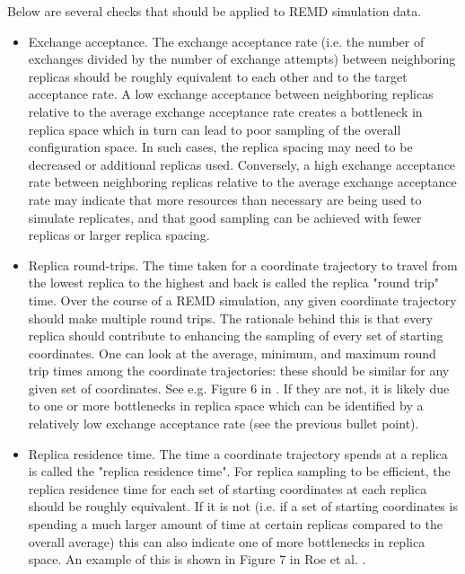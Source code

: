 Below are several checks that should be applied to REMD simulation data.

\begin{itemize}
  \item Exchange acceptance. The exchange acceptance rate (i.e. the number of exchanges divided by the number of exchange attempts) between neighboring replicas should be roughly equivalent to each other and to the target acceptance rate. A low exchange acceptance between neighboring replicas relative to the average exchange acceptance rate creates a bottleneck in replica space which in turn can lead to poor sampling of the overall configuration space.  In such cases, the replica spacing may need to be decreased or additional replicas used.  Conversely, a high exchange acceptance rate between neighboring replicas relative to the average exchange acceptance rate may indicate that more resources than necessary are being used to simulate replicates, and that good sampling can be achieved with fewer replicas or larger replica spacing.  
  \item Replica round-trips. The time taken for a coordinate trajectory to travel from the lowest replica to the highest and back is called the replica "round trip" time. Over the course of a REMD simulation, any given coordinate trajectory should make multiple round trips. The rationale behind this is that every replica should contribute to enhancing the sampling of every set of starting coordinates.  
One can look at the average, minimum, and maximum round trip times among the coordinate trajectories: these should be similar for any given set of coordinates. See e.g. Figure 6 in \citep{Roe2014}. %
If they are not, it is likely due to one or more bottlenecks in replica space which can be identified by a relatively low exchange acceptance rate (see the previous bullet point).
  \item Replica residence time. The time a coordinate trajectory spends at a replica is called the "replica residence time". For replica sampling to be efficient, the replica residence time for each set of starting coordinates at each replica should be roughly equivalent. If it is not (i.e. if a set of starting coordinates is spending a much larger amount of time at certain replicas compared to the overall average) this can also indicate one of more bottlenecks in replica space. An example of this is shown in Figure 7 in Roe et al. \citep{Roe2014}. 

\end{itemize}
